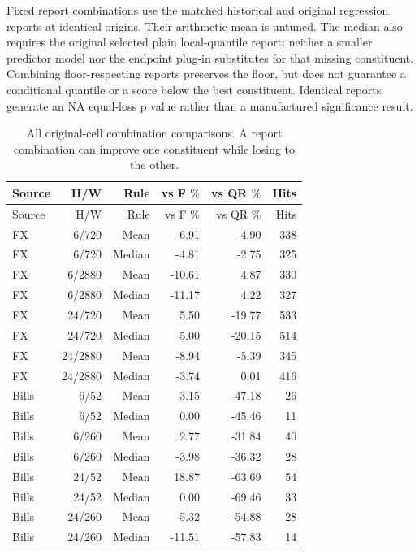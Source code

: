 \documentclass[11pt,a4paper]{article}
\begin{document}
Fixed report combinations use the matched historical and original
regression reports at identical origins. Their arithmetic mean is untuned.
The median also requires the original selected plain local-quantile report;
neither a smaller predictor model nor the endpoint plug-in substitutes for
that missing constituent. Combining floor-respecting reports preserves the
floor, but does not guarantee a conditional quantile or a score below the
best constituent. Identical reports generate an NA equal-loss p value rather
than a manufactured significance result.
\begingroup
\small
\setlength{\tabcolsep}{3pt}
\renewcommand{\arraystretch}{1.12}
\begin{longtable}{lrrrrr}
\caption{All original-cell combination comparisons. A report combination can improve one constituent while losing to the other.}\\
\toprule
Source & H/W & Rule & vs F \(\%\) & vs QR \(\%\) & Hits \\
\midrule
\endfirsthead
\toprule
Source & H/W & Rule & vs F \(\%\) & vs QR \(\%\) & Hits \\
\midrule
\endhead
\bottomrule
\endfoot
FX & 6/720 & Mean & -6.91 & -4.90 & 338 \\
FX & 6/720 & Median & -4.81 & -2.75 & 325 \\
FX & 6/2880 & Mean & -10.61 & 4.87 & 330 \\
FX & 6/2880 & Median & -11.17 & 4.22 & 327 \\
FX & 24/720 & Mean & 5.50 & -19.77 & 533 \\
FX & 24/720 & Median & 5.00 & -20.15 & 514 \\
FX & 24/2880 & Mean & -8.94 & -5.39 & 345 \\
FX & 24/2880 & Median & -3.74 & 0.01 & 416 \\
Bills & 6/52 & Mean & -3.15 & -47.18 & 26 \\
Bills & 6/52 & Median & 0.00 & -45.46 & 11 \\
Bills & 6/260 & Mean & 2.77 & -31.84 & 40 \\
Bills & 6/260 & Median & -3.98 & -36.32 & 28 \\
Bills & 24/52 & Mean & 18.87 & -63.69 & 54 \\
Bills & 24/52 & Median & 0.00 & -69.46 & 33 \\
Bills & 24/260 & Mean & -5.32 & -54.88 & 28 \\
Bills & 24/260 & Median & -11.51 & -57.83 & 14 \\
\end{longtable}
\endgroup
\end{document}
